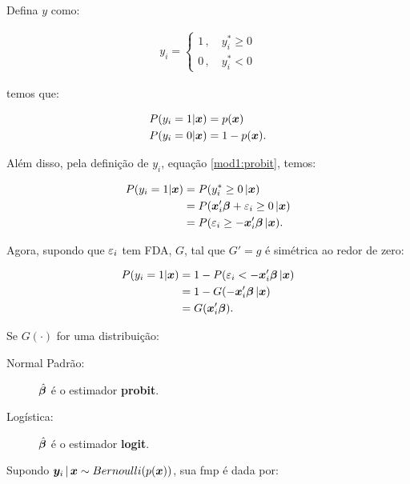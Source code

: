\documentclass[11pt, oneside, a4paper, article]{article}
\numberwithin{equation}{section}
\begin{document}
\begin{description}
\noindent
Defina $y$ como:

\vspace{-1 em}
\begin{align*}
y_{i} =
\begin{cases}
	1 \, , \quad y^{*}_{i} \geq 0
\\
	0 \, , \quad y^{*}_{i} < 0
\end{cases}
\end{align*}

\noindent
temos que:

\vspace{-1 em}
\begin{align*}
	P( y_{i} = 1 | \boldsymbol{x} ) &= p( \boldsymbol{x} )
	\\
	P( y_{i} = 0 | \boldsymbol{x} ) &= 1 - p( \boldsymbol{x} ).
\end{align*}

Além disso, pela definição de $y_{i}$, equação \eqref{mod1:probit}, temos:

\vspace{-1 em}
\begin{align*}
	P( y_{i} = 1 | \boldsymbol{x} ) &= P(y_{i}^{*} \geq 0 \, | \boldsymbol{x} )
\\
&= P( \boldsymbol{x}_{i}' \boldsymbol{\beta} + \varepsilon_{i} \geq 0 \, | \boldsymbol{x} )
\\
&= P( \varepsilon_{i} \geq - \boldsymbol{x}_{i}' \boldsymbol{\beta}  \, | \boldsymbol{x} ).
\end{align*}

\noindent
Agora, supondo que $\varepsilon_{i}$ tem FDA, $G$, tal que $G'=g$ é simétrica ao redor de zero:

\vspace{-1 em}
\begin{align*}
P( y_{i} = 1 | \boldsymbol{x} ) 
&= 1 - P( \varepsilon_{i} < - \boldsymbol{x}_{i}' \boldsymbol{\beta}  \, | \boldsymbol{x} )
\\
&= 1 - G( - \boldsymbol{x}_{i}' \boldsymbol{\beta}  \, | \boldsymbol{x} )
\\
&= G( \boldsymbol{x}_{i}' \boldsymbol{\beta} ).
\end{align*}

Se $G(\cdot)$ for uma distribuição:

\begin{description}
	\item [Normal Padrão:] $\hat{\boldsymbol{\beta}}$ é o estimador \textbf{probit}.
	\item [Logística:] $\hat{\boldsymbol{\beta}}$ é o estimador \textbf{logit}.
\end{description}

Supondo $\boldsymbol{y}_{i} \, | \, \boldsymbol{x} \sim Bernoulli(p(\boldsymbol{x}))$, sua fmp é dada por:


\end{description}
\end{document}
